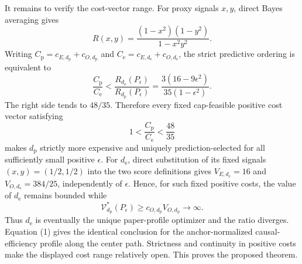 It remains to verify the cost-vector range. For proxy signals \(x,y\), direct Bayes averaging gives
\[
 R(x,y)=\frac{(1-x^2)(1-y^2)}{1-x^2y^2}.
\]
Writing \(C_{\mathrm p}=c_{E,d_{\mathrm p}}+c_{O,d_{\mathrm p}}\) and \(C_{\mathrm e}=c_{E,d_{\mathrm e}}+c_{O,d_{\mathrm e}}\), the strict predictive ordering is equivalent to
\[
 \frac{C_{\mathrm p}}{C_{\mathrm e}}
 <\frac{R_{d_{\mathrm e}}(P_\epsilon)}{R_{d_{\mathrm p}}(P_\epsilon)}
 =\frac{3(16-9\epsilon^2)}{35(1-\epsilon^2)}. \tag{3}
\]
The right side tends to \(48/35\). Therefore every fixed cap-feasible positive cost vector satisfying
\[
 1<\frac{C_{\mathrm p}}{C_{\mathrm e}}<\frac{48}{35}
\]
makes \(d_{\mathrm p}\) strictly more expensive and uniquely prediction-selected for all sufficiently small positive \(\epsilon\).  For \(d_{\mathrm e}\), direct substitution of its fixed signals \((x,y)=(1/2,1/2)\) into the two score definitions gives \(V_{E,d_{\mathrm e}}=16\) and \(V_{O,d_{\mathrm e}}=384/25\), independently of \(\epsilon\).  Hence, for such fixed positive costs, the value of \(d_{\mathrm e}\) remains bounded while
\[
 \mathcal V_{d_{\mathrm p}}^*(P_\epsilon)
 \ge c_{O,d_{\mathrm p}}V_{O,d_{\mathrm p}}\longrightarrow\infty.
\]
Thus \(d_{\mathrm e}\) is eventually the unique paper-profile optimizer and the ratio diverges. Equation (1) gives the identical conclusion for the anchor-normalized causal-efficiency profile along the center path. Strictness and continuity in positive costs make the displayed cost range relatively open. This proves the proposed theorem.